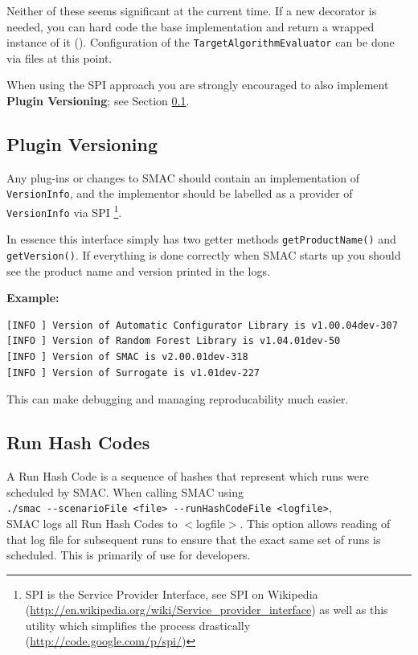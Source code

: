 \documentclass[manual.tex]{subfiles}
\begin{document}
Neither of these seems significant at the current time. If a new decorator is needed, you can hard code the base implementation and return a wrapped instance of it (). Configuration of the \texttt{TargetAlgorithmEvaluator} can be done via files at this point.

When using the SPI approach you are strongly encouraged to also implement \textbf{Plugin Versioning}; see Section \ref{sec:plugin-versioning}.


\subsection{Plugin Versioning}
\label{sec:plugin-versioning}

Any plug-ins or changes to SMAC should contain an implementation of \texttt{VersionInfo}, and 
the implementor should be labelled as a provider of \texttt{VersionInfo} via SPI \footnote{SPI is the Service Provider Interface, see SPI on Wikipedia (\url{http://en.wikipedia.org/wiki/Service_provider_interface}) as well as this utility which simplifies the process drastically (\url{http://code.google.com/p/spi/})}.

In essence this interface simply has two getter methods \texttt{getProductName()} and \texttt{getVersion()}. If everything is done correctly when SMAC starts up you should 
see the product name and version printed in the logs.

\textbf{Example:}
\small
\begin{verbatim}
[INFO ] Version of Automatic Configurator Library is v1.00.04dev-307 
[INFO ] Version of Random Forest Library is v1.04.01dev-50 
[INFO ] Version of SMAC is v2.00.01dev-318 
[INFO ] Version of Surrogate is v1.01dev-227 
\end{verbatim}
\normalsize 
	This can make debugging and managing reproducability much easier.
	
	
\subsection{Run Hash Codes}

A Run Hash Code is a sequence of hashes that represent which runs
were scheduled by SMAC. 
When calling SMAC using\\
\texttt{./smac~-{}-scenarioFile~<file>~-{}-runHashCodeFile~<logfile>},\\
SMAC logs all Run Hash Codes to $<$logfile$>$.
This option allows reading of that log file for subsequent runs to ensure that the exact same set of runs is scheduled. This is primarily of use for developers.

	
\end{document}
